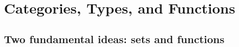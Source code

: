 \documentclass[12pt]{article}
\theoremstyle{definition}
\begin{document}
\tableofcontents
\section{Categories, Types, and Functions}
\subsection{Two fundamental ideas: sets and functions}

\printindex
\end{document}

